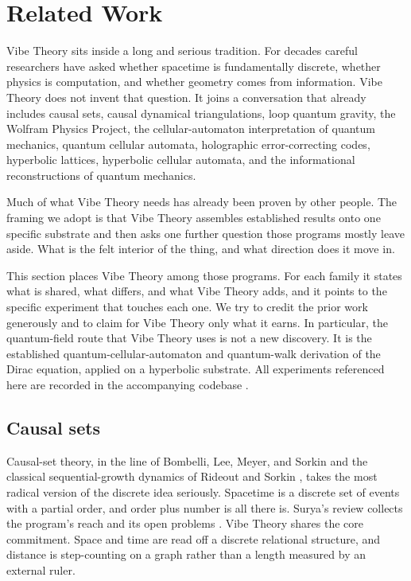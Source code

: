 \section{Related Work}

Vibe Theory sits inside a long and serious tradition. For decades careful researchers have asked whether
spacetime is fundamentally discrete, whether physics is computation, and whether geometry comes from
information. Vibe Theory does not invent that question. It joins a conversation that already includes causal
sets, causal dynamical triangulations, loop quantum gravity, the Wolfram Physics Project, the
cellular-automaton interpretation of quantum mechanics, quantum cellular automata, holographic
error-correcting codes, hyperbolic lattices, hyperbolic cellular automata, and the informational
reconstructions of quantum mechanics.

Much of what Vibe Theory needs has already been proven by other
people. The framing we adopt is that Vibe Theory assembles established results onto one specific substrate
and then asks one further question those programs mostly leave aside. What is the felt interior of the thing,
and what direction does it move in.

This section places Vibe Theory among those programs. For each family it states what is shared, what differs,
and what Vibe Theory adds, and it points to the specific experiment that touches each one. We try to credit
the prior work generously and to claim for Vibe Theory only what it earns. In particular, the quantum-field
route that Vibe Theory uses is not a new discovery. It is the established quantum-cellular-automaton and
quantum-walk derivation of the Dirac equation, applied on a hyperbolic substrate. All experiments referenced
here are recorded in the accompanying codebase \cite{pollard2026vibetest}.

\subsection{Causal sets}

Causal-set theory, in the line of Bombelli, Lee, Meyer, and Sorkin \cite{bombelli1987} and the classical
sequential-growth dynamics of Rideout and Sorkin \cite{rideout1999}, takes the most radical version of the
discrete idea seriously. Spacetime is a discrete set of events with a partial order, and order plus number is
all there is. Surya's review collects the program's reach and its open problems \cite{surya2019}. Vibe Theory
shares the core commitment. Space and time are read off a discrete relational structure, and distance is
step-counting on a graph rather than a length measured by an external ruler.

